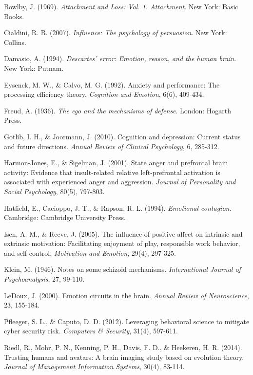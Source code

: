 \documentclass[11pt,a4paper]{article}
\begin{document}
\begin{thebibliography}{99}

Bowlby, J. (1969). \textit{Attachment and Loss: Vol. 1. Attachment}. New York: Basic Books.

Cialdini, R. B. (2007). \textit{Influence: The psychology of persuasion}. New York: Collins.

Damasio, A. (1994). \textit{Descartes' error: Emotion, reason, and the human brain}. New York: Putnam.

Eysenck, M. W., \& Calvo, M. G. (1992). Anxiety and performance: The processing efficiency theory. \textit{Cognition and Emotion}, 6(6), 409-434.

Freud, A. (1936). \textit{The ego and the mechanisms of defense}. London: Hogarth Press.

Gotlib, I. H., \& Joormann, J. (2010). Cognition and depression: Current status and future directions. \textit{Annual Review of Clinical Psychology}, 6, 285-312.

Harmon-Jones, E., \& Sigelman, J. (2001). State anger and prefrontal brain activity: Evidence that insult-related relative left-prefrontal activation is associated with experienced anger and aggression. \textit{Journal of Personality and Social Psychology}, 80(5), 797-803.

Hatfield, E., Cacioppo, J. T., \& Rapson, R. L. (1994). \textit{Emotional contagion}. Cambridge: Cambridge University Press.

Isen, A. M., \& Reeve, J. (2005). The influence of positive affect on intrinsic and extrinsic motivation: Facilitating enjoyment of play, responsible work behavior, and self-control. \textit{Motivation and Emotion}, 29(4), 297-325.

Klein, M. (1946). Notes on some schizoid mechanisms. \textit{International Journal of Psychoanalysis}, 27, 99-110.

LeDoux, J. (2000). Emotion circuits in the brain. \textit{Annual Review of Neuroscience}, 23, 155-184.

Pfleeger, S. L., \& Caputo, D. D. (2012). Leveraging behavioral science to mitigate cyber security risk. \textit{Computers \& Security}, 31(4), 597-611.

Riedl, R., Mohr, P. N., Kenning, P. H., Davis, F. D., \& Heekeren, H. R. (2014). Trusting humans and avatars: A brain imaging study based on evolution theory. \textit{Journal of Management Information Systems}, 30(4), 83-114.


\end{thebibliography}
\end{document}
